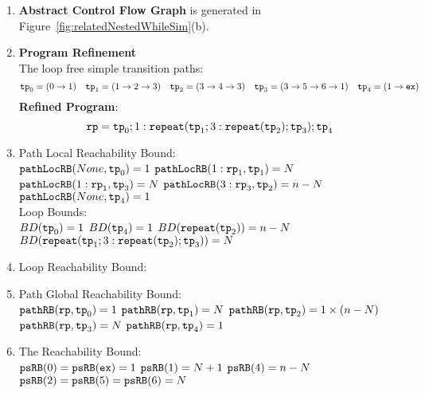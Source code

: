 \begin{enumerate}
  \item  \textbf{Abstract Control Flow Graph} is generated in Figure~\ref{fig:relatedNestedWhileSim}(b).

  \item \textbf{Program Refinement}
  \\
  The loop free simple transition paths:
  \[
          \mathtt{tp}_0 = (0 \to 1)
          \quad
          \mathtt{tp}_1 = (1 \to 2 \to 3)
          \quad           
          \mathtt{tp}_2 = (3 \to 4 \to 3)
          \quad
          \mathtt{tp}_3 = (3 \to 5 \to 6 \to 1)
          \quad
          \mathtt{tp}_4 = (1 \to \mathtt{ex})
      \]
  \textbf{Refined Program}:
  \[
  \mathtt{rp} = \mathtt{tp}_0 ; 1: \mathtt{repeat}(\mathtt{tp}_1; 3: \mathtt{repeat}(\mathtt{tp}_2); \mathtt{tp}_3); \mathtt{tp}_4
  \]
\item {Path Local Reachability Bound}:
\\
$\mathtt{pathLocRB}(None, \mathtt{tp}_0) = 1$ \quad
$\mathtt{pathLocRB}(1: \mathtt{rp}_1, \mathtt{tp}_1) = N$ \quad
$\mathtt{pathLocRB}(1: \mathtt{rp}_1, \mathtt{tp}_3) = N$ \quad
$\mathtt{pathLocRB}(3: \mathtt{rp}_3, \mathtt{tp}_2) = n - N$ \\
$\mathtt{pathLocRB}(None, \mathtt{tp}_4) = 1$
%
\\
Loop Bounds:
\\
$BD(\mathtt{tp}_0) = 1$
\quad
$BD(\mathtt{tp}_4) = 1$
\quad
$BD(\mathtt{repeat}(\mathtt{tp}_2)) = n - N $
\quad
$BD(\mathtt{repeat}(\mathtt{tp}_1; 3: \mathtt{repeat}(\mathtt{tp}_2); \mathtt{tp}_3)) = N $
%
\item Loop Reachability Bound:
\\
%
%
\item Path Global Reachability Bound:
\\
$\mathtt{pathRB}(\mathtt{rp}, \mathtt{tp}_0) = 1$ \quad
$\mathtt{pathRB}(\mathtt{rp}, \mathtt{tp}_1) = N$ \quad
$\mathtt{pathRB}(\mathtt{rp}, \mathtt{tp}_2) = 1 \times (n - N)$ \quad
$\mathtt{pathRB}(\mathtt{rp}, \mathtt{tp}_3) = N$ \quad
$\mathtt{pathRB}(\mathtt{rp}, \mathtt{tp}_4) = 1$
%
\item The Reachability Bound:
\\
$\mathtt{psRB}(0) = \mathtt{psRB}(\mathtt{ex}) = 1$ \quad
$\mathtt{psRB}(1) = N + 1$ \quad
$\mathtt{psRB}(4) = n - N$ \quad \\
$\mathtt{psRB}(2) = \mathtt{psRB}(5) =  \mathtt{psRB}(6) = N$ \quad
{}
\end{enumerate}
